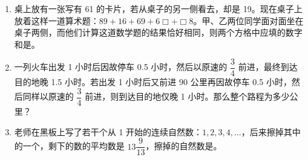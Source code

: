 \documentclass[UTF8,12pt,a4paper]{ctexart}
\newcommand{\BottomWriteSpace}{0.5cm}
\newenvironment{OnePageEightFill}{
  \small
  \vspace*{0pt}
  \begin{enumerate}[leftmargin=*, itemsep=0pt, topsep=0pt, parsep=0pt, partopsep=0pt]
  \setlength{\parskip}{0pt}
}{
  \end{enumerate}
  \vspace*{\BottomWriteSpace}
  \normalsize
  \newpage
}
\newcommand{\Q}[1]{\item #1\par\vfill}
\newcommand{\Qlast}[1]{\item #1\par}
\begin{document}
\begin{OnePageEightFill}
\Q{桌上放有一张写有 61 的卡片，若从桌子的另一侧看去，却是 19。现在桌子上放着这样一道算术题：$89 + 16 + 69 + 6\Box + \Box8$。甲、乙两位同学面对面坐在桌子两侧，而他们计算这道数学题的结果恰好相同，则两个方格中应填的数字和是\underline{\hspace{3em}}。}

\Q{一列火车出发 1 小时后因故停车 0.5 小时，然后以原速的 $\dfrac{3}{4}$ 前进，最终到达目的地晚 1.5 小时。若出发 1 小时后又前进 90 公里再因故停车 0.5 小时，然后同样以原速的 $\dfrac{3}{4}$ 前进，则到达目的地仅晚 1 小时。那么整个路程为多少公里？}

\Qlast{老师在黑板上写了若干个从 1 开始的连续自然数：$1, 2, 3, 4, \dots$，后来擦掉其中的一个，剩下的数的平均数是 $13\dfrac{9}{13}$，擦掉的自然数是\underline{\hspace{3em}}。}

\end{OnePageEightFill}

\end{document}
